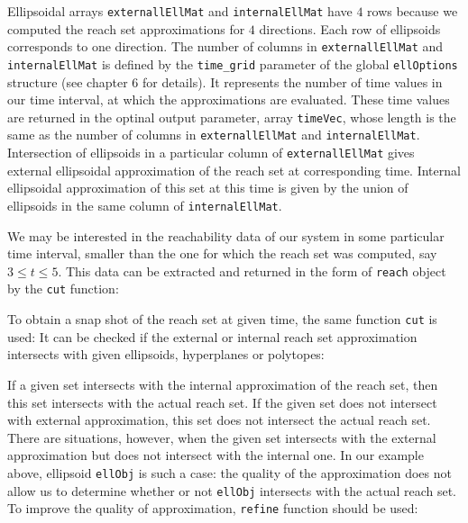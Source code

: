 Ellipsoidal arrays {\tt externallEllMat} and {\tt internalEllMat} have $4$ rows because we computed
the reach set approximations for $4$ directions. Each row of ellipsoids
corresponds to one direction. The number of columns in {\tt externallEllMat} and {\tt internalEllMat}
is defined by the {\tt time\_grid} parameter of the global {\tt ellOptions}
structure (see chapter 6 for details). It represents the number of time values
in our time interval, at which the approximations are evaluated. These
time values are returned in the optinal output parameter, array {\tt timeVec},
whose length is the same as the number of columns in {\tt externallEllMat} and {\tt internalEllMat}.
Intersection of ellipsoids in a particular column of {\tt externallEllMat} gives
external ellipsoidal approximation of the reach set at corresponding time.
Internal ellipsoidal approximation of this set at this time is given by the
union of ellipsoids in the same column of {\tt internalEllMat}.

We may be interested in the reachability data of our system in some
particular time interval, smaller than the one for which the reach set was
computed, say $3\leq t\leq5$.
This data can be extracted and returned in the form of {\tt reach}
object by the {\tt cut} function:

To obtain a snap shot of the reach set at given time, the same function
{\tt cut} is used:
It can be checked if the external or internal reach set approximation
intersects with given ellipsoids, hyperplanes or polytopes:




If a given set intersects with the internal approximation of the reach set,
then this set intersects with the actual reach set.
If the given set does not
intersect with external approximation, this set does not
intersect the actual reach set. There are situations, however, when the
given set intersects with the external approximation but does not intersect
with the internal one. In our example above, ellipsoid {\tt ellObj} is such a case:
the quality of the approximation does not allow us to determine whether or not
{\tt ellObj} intersects with the actual reach set. To improve the quality
of approximation, {\tt refine} function should be used:

